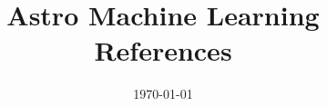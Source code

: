 \documentclass[11pt]{article}
\begin{document}
\title{Astro Machine Learning References}

\date{\today}
\maketitle


\nocite{*}


\printbibliography
\end{document}
